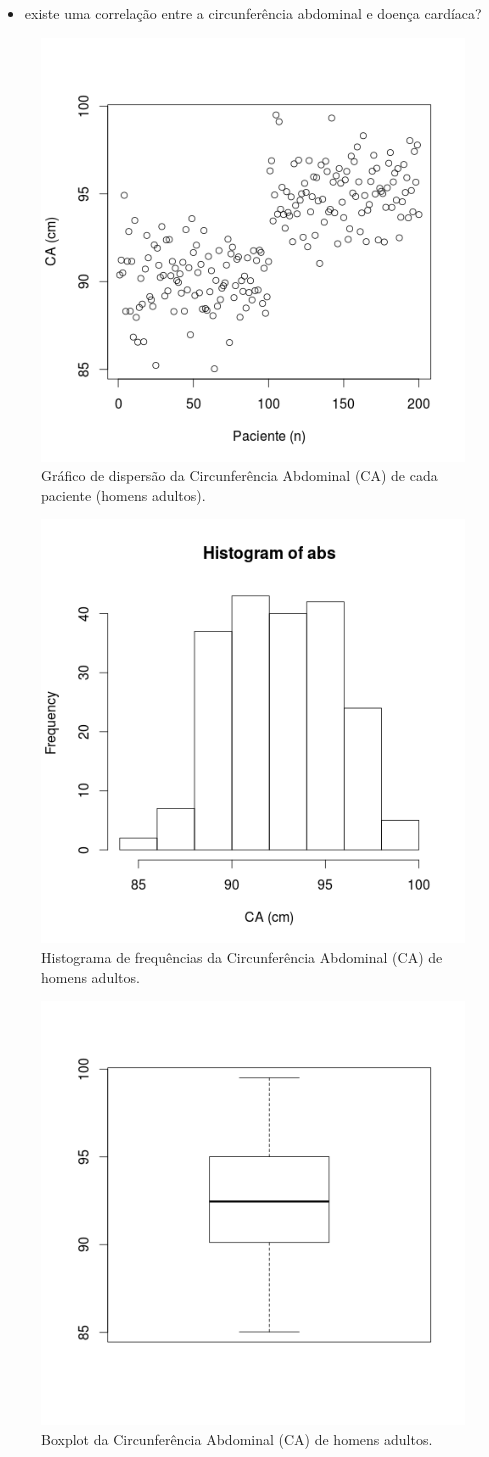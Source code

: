 \documentclass[a4paper]{article}
\begin{document}
\begin{itemize}
\item existe uma correlação entre a circunferência abdominal e doença
  cardíaca?
\end{itemize}

\begin{figure}[h]
  \centering
  \includegraphics[width=.5\textwidth]{dispersao}
  \caption{Gráfico de dispersão da Circunferência Abdominal (CA) de
    cada paciente (homens adultos).}
  \label{fig:dispersao}
\end{figure}

\begin{figure}[h]
  \centering
  \includegraphics[width=.5\textwidth]{histograma}
  \caption{Histograma de frequências da Circunferência Abdominal (CA)
    de homens adultos.}
  \label{fig:histograma}
\end{figure}

\begin{figure}[h]
  \centering
  \includegraphics[width=.5\textwidth]{boxplot}
  \caption{Boxplot da Circunferência Abdominal (CA) de homens
    adultos.}
  \label{fig:boxplot}
\end{figure}
\end{document}
